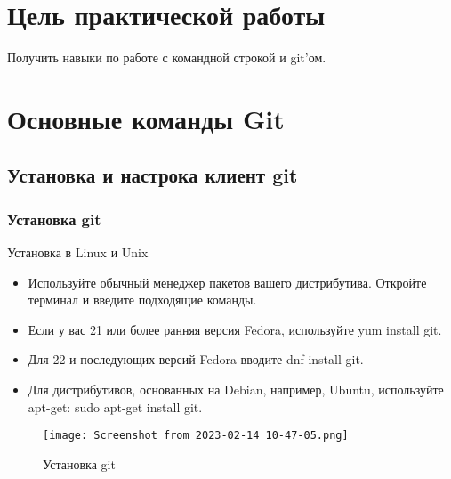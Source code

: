 \graphicspath{{~/Documents/SADT/FirstTask/TheBasics/}}
\chapter*{\LARGE{Цель практической работы}}
Получить навыки по работе с командной строкой и git’ом.

\chapter{Основные команды Git}

\section{Установка и настрока клиент git}
\subsection{Установка git}
Установка в Linux и Unix
\begin{itemize}
	\item Используйте обычный менеджер пакетов вашего дистрибутива.
		Откройте терминал и введите подходящие команды.
	\item Если у вас 21 или более ранняя версия Fedora,
		используйте yum install git.
	\item Для 22 и последующих версий Fedora вводите dnf install git.
	\item Для дистрибутивов, основанных на Debian, например, Ubuntu,
		используйте apt-get: sudo apt-get install git.
\end{itemize}
\begin{figure}[h!tp]
	\centering
	\texttt{[image: Screenshot from 2023-02-14 10-47-05.png]}
	\caption{Установка git}
	\label{fig:git:install}
\end{figure}

